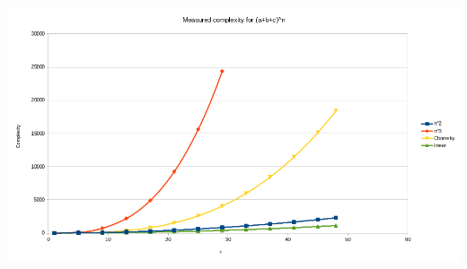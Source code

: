 \documentclass[twocolumn]{article}
\begin{document}
\newpage
\subsection{ }
\begin{center}
  \label{fig:complexity_random_abc}
  \includegraphics[width=\textwidth]{linear/complexity_random_abc}
\end{center}
\end{document}

